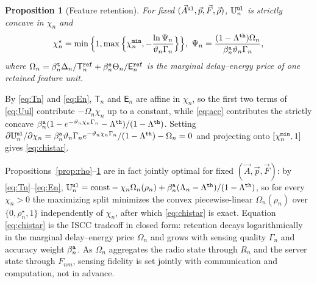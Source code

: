 \documentclass[journal]{IEEEtran}
\newtheorem{proposition}{Proposition}
\begin{document}
\begin{proposition}[Feature retention]\label{prop:chi}
For fixed $(\vec{A}^{\tt ul},\vec{p},\vec{F},\vec{\rho})$, $\mathbb{U}_n^{\tt ul}$ is strictly concave in $\chi_n$ and
\begin{equation}
\chi_n^\star
=\min\Big\{1,\max\Big\{\chi_n^{\tt min},-\frac{\ln\Psi_n}{\vartheta_n \Gamma_n}\Big\}\Big\},
\ 
\Psi_n=\frac{(1-\Lambda^{\tt th})\Omega_n}{\beta_n^{\tt a}\vartheta_n \Gamma_n},
\label{eq:chistar}
\end{equation}
where $\Omega_n=\beta_n^{\tt t}\Delta_n/\mathsf{T}_n^{\tt ref}+\beta_n^{\tt e}\Theta_n/\mathsf{E}_n^{\tt ref}$ is the marginal delay--energy price of one retained feature unit.
\end{proposition}
\begin{IEEEproof}
By \eqref{eq:Tn} and \eqref{eq:En}, $\mathsf{T}_n$ and $\mathsf{E}_n$ are affine in $\chi_n$, so the first two terms of \eqref{eq:Uul} contribute $-\Omega_n\chi_n$ up to a constant, while \eqref{eq:acc} contributes the strictly concave $\beta_n^{\tt a}(1-e^{-\vartheta_n\chi_n \Gamma_n}-\Lambda^{\tt th})/(1-\Lambda^{\tt th})$. Setting $\partial\mathbb{U}_n^{\tt ul}/\partial\chi_n=\beta_n^{\tt a}\vartheta_n \Gamma_n e^{-\vartheta_n\chi_n \Gamma_n}/(1-\Lambda^{\tt th})-\Omega_n=0$ and projecting onto $[\chi_n^{\tt min},1]$ gives \eqref{eq:chistar}.
\end{IEEEproof}
Propositions~\ref{prop:rho}--\ref{prop:chi} are in fact jointly optimal for fixed $(\vec{A},\vec{p},\vec{F})$: by \eqref{eq:Tn}--\eqref{eq:En}, $\mathbb{U}_n^{\tt ul}=\mathrm{const}-\chi_n\Omega_n(\rho_n)+\beta_n^{\tt a}(\Lambda_n-\Lambda^{\tt th})/(1-\Lambda^{\tt th})$, so for every $\chi_n>0$ the maximizing split minimizes the convex piecewise-linear $\Omega_n(\rho_n)$ over $\{0,\rho_n^\star,1\}$ independently of $\chi_n$, after which \eqref{eq:chistar} is exact. Equation \eqref{eq:chistar} is the ISCC tradeoff in closed form: retention decays logarithmically in the marginal delay--energy price $\Omega_n$ and grows with sensing quality $\Gamma_n$ and accuracy weight $\beta_n^{\tt a}$. As $\Omega_n$ aggregates the radio state through $R_n$ and the server state through $F_{nm}$, sensing fidelity is set jointly with communication and computation, not in advance.
\end{document}
